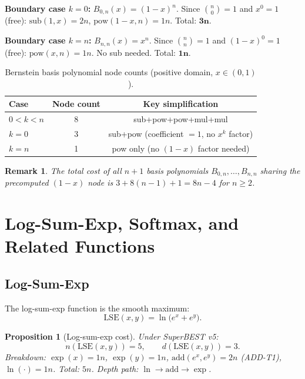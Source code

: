 \documentclass[11pt,a4paper]{article}
\newtheorem{proposition}[theorem]{Proposition}
\newtheorem{remark}{Remark}[section]
\begin{document}
\textbf{Boundary case $k = 0$:} $B_{0,n}(x) = (1-x)^n$. Since $\binom{n}{0} = 1$ and
$x^0 = 1$ (free): $\mathrm{sub}(1,x) = 2n$, $\mathrm{pow}(1-x, n) = 1n$. Total: $\mathbf{3n}$.

\textbf{Boundary case $k = n$:} $B_{n,n}(x) = x^n$. Since $\binom{n}{n} = 1$ and
$(1-x)^0 = 1$ (free): $\mathrm{pow}(x, n) = 1n$. No sub needed. Total: $\mathbf{1n}$.

\begin{table}[h]
\centering
\caption{Bernstein basis polynomial node counts (positive domain, $x \in (0,1)$).}
\label{tab:bernstein}
\begin{tabular}{lcc}
\toprule
Case & Node count & Key simplification \\
\midrule
$0 < k < n$ & 8 & sub+pow+pow+mul+mul \\
$k = 0$     & 3 & sub+pow (coefficient $=1$, no $x^k$ factor) \\
$k = n$     & 1 & pow only (no $(1-x)$ factor needed) \\
\bottomrule
\end{tabular}
\end{table}

\begin{remark}
  The total cost of all $n+1$ basis polynomials $B_{0,n}, \ldots, B_{n,n}$ sharing the
  precomputed $(1-x)$ node is $3 + 8(n-1) + 1 = 8n - 4$ for $n \geq 2$.
\end{remark}

\section{Log-Sum-Exp, Softmax, and Related Functions}

\subsection{Log-Sum-Exp}

The log-sum-exp function is the smooth maximum:
\[
  \mathrm{LSE}(x, y) = \ln\!\bigl(e^x + e^y\bigr).
\]

\begin{proposition}[Log-sum-exp cost]
\label{prop:lse}
  Under SuperBEST v5:
  \[
    n(\mathrm{LSE}(x,y)) = 5, \qquad d(\mathrm{LSE}(x,y)) = 3.
  \]
  Breakdown: $\exp(x) = 1n$, $\exp(y) = 1n$, $\mathrm{add}(e^x, e^y) = 2n$ (ADD-T1),
  $\ln(\cdot) = 1n$. Total: $5n$. Depth path: $\ln \to \mathrm{add} \to \exp$.
\end{proposition}
\end{document}

